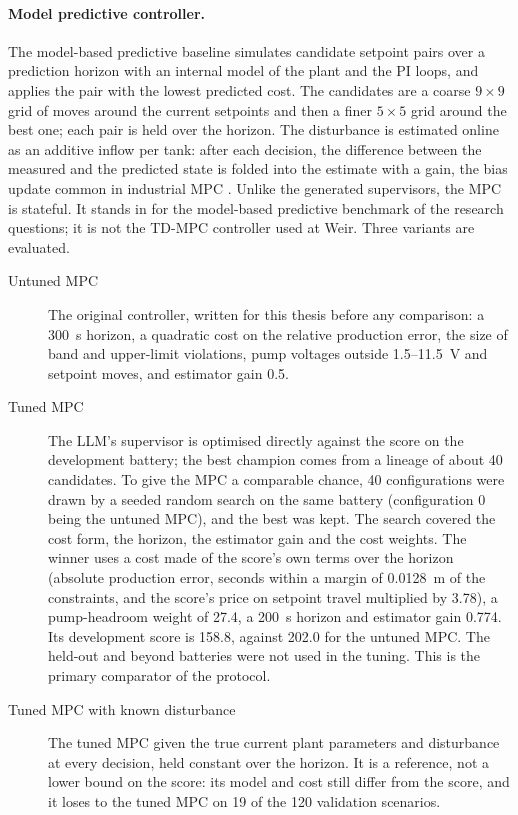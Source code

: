 \paragraph{Model predictive controller.} The model-based predictive baseline
simulates candidate setpoint pairs over a prediction horizon with an
internal model of the plant and the PI loops, and applies the pair with the
lowest predicted cost. The candidates are a coarse $9 \times 9$ grid of moves
around the current setpoints and then a finer $5 \times 5$ grid around the
best one; each pair is held over the horizon. The disturbance is estimated
online as an additive inflow per tank: after each decision, the difference
between the measured and the predicted state is folded into the estimate
with a gain, the bias update common in industrial MPC \cite{qin2003}. Unlike
the generated supervisors, the MPC is stateful. It stands in for the
model-based predictive benchmark of the research questions; it is not the
TD-MPC controller used at Weir. Three variants are evaluated.
\begin{description}
\item[Untuned MPC] The original controller, written for this thesis before
  any comparison: a 300~s horizon, a quadratic cost on the relative
  production error, the size of band and upper-limit violations, pump
  voltages outside 1.5--11.5~V and setpoint moves, and estimator gain 0.5.
\item[Tuned MPC] The LLM's supervisor is optimised directly against the
  score on the development battery; the best champion comes from a lineage
  of about 40 candidates. To give the MPC a comparable chance, 40
  configurations were drawn by a seeded random search on the same battery
  (configuration 0 being the untuned MPC), and the best was kept. The
  search covered the cost form, the horizon, the estimator gain and the
  cost weights. The winner uses a cost made of the score's own terms over the
  horizon (absolute production error, seconds within a margin of 0.0128~m of
  the constraints, and the score's price on setpoint travel multiplied by
  3.78), a pump-headroom weight of 27.4, a 200~s horizon and estimator gain
  0.774. Its development score is 158.8, against 202.0 for the untuned MPC.
  The held-out and beyond batteries were not used in the tuning. This is the
  primary comparator of the protocol.
\item[Tuned MPC with known disturbance] The tuned MPC given the true current
  plant parameters and disturbance at every decision, held constant over the
  horizon. It is a reference, not a lower bound on the score: its model and
  cost still differ from the score, and it loses to the tuned MPC on 19 of
  the 120 validation scenarios.
\end{description}

